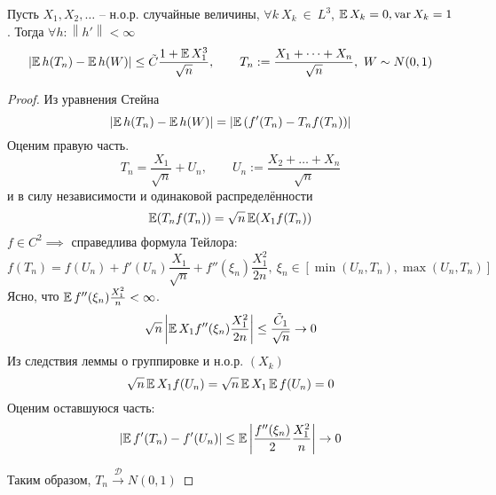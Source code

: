 \begin{theorem}
    Пусть $X_1, X_2, \dots$ -- н.о.р. случайные величины, $\forall k \ X_k~\in~L^3$, $\operatorname*{\mathbb{E}} X_k = 0, \operatorname*{var} X_k = 1$.
    Тогда $\forall h\colon \left\|h'\right\| < \infty$
    \begin{equation*}
        \left|\operatorname*{\mathbb{E}} h(T_n) - \operatorname*{\mathbb{E}} h(W)\right| \leq \tilde C \frac{1+\operatorname*{\mathbb{E}} X_1^3}{\sqrt{n}}, \qquad T_n:=\frac{X_1+\dots+X_n}{\sqrt{n}}, \ W\sim N(0, 1)
    \end{equation*}
\end{theorem}
\begin{proof}
    Из уравнения Стейна\begin{equation*}
        \left|\operatorname*{\mathbb{E}} h(T_n) - \operatorname*{\mathbb{E}} h(W)\right| = \left|\operatorname*{\mathbb{E}} \left(f'(T_n)-T_n f(T_n)\right)\right|
    \end{equation*}
    Оценим правую часть. 
    \begin{equation*}
        T_n = \frac{X_1}{\sqrt{n}} + U_n, \qquad U_n:=\frac{X_2 + \dots + X_n}{\sqrt{n}}
    \end{equation*}
    и в силу независимости и одинаковой распределённости
    \begin{equation*}
        \operatorname*{\mathbb{E}} (T_n f(T_n)) = \sqrt{n}\operatorname*{\mathbb{E}} (X_1f(T_n))
    \end{equation*}
    $f\in C^2 \implies $ справедлива формула Тейлора:
    \begin{equation*}
        f(T_n) = f(U_n)+f'(U_n)\frac{X_1}{\sqrt{n}} +f''(\xi_n)\frac{X_1^2}{2n}, \ \xi_n \in \left[\min(U_n, T_n), \max(U_n, T_n)\right]
    \end{equation*}
    Ясно, что $\operatorname*{\mathbb{E}} f''(\xi_n) \frac{X_1^2}{n} < \infty$.
    \begin{equation*}
        \sqrt{n}\left|\operatorname*{\mathbb{E}} X_1f''(\xi_n)\frac{X_1^2}{2n}\right|\leq \frac{\tilde C_1}{\sqrt{n}} \to 0
    \end{equation*}
    Из следствия леммы о группировке и н.о.р. $(X_k)$
    \begin{equation*}
        \sqrt{n}\operatorname*{\mathbb{E}} X_1 f(U_n) = \sqrt{n} \operatorname*{\mathbb{E}} X_1 \operatorname*{\mathbb{E}} f(U_n) = 0
    \end{equation*}
    Оценим оставшуюся часть:
    \begin{equation*}
        \left| \operatorname*{\mathbb{E}} f'(T_n)-f'(U_n) \right| \leq \operatorname*{\mathbb{E}} \left|\frac{f''(\xi_n)}{2} \frac{X_1^2}{n} \right| \to 0
    \end{equation*}
    
    Таким образом, $T_n \overset{\mathcal{D}}{\to} N(0, 1)$
\end{proof}



